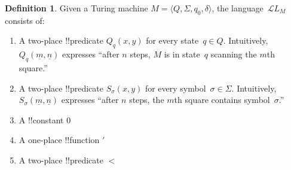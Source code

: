 \documentclass[10pt,a4paper]{article}
\theoremstyle{plain}
\theoremstyle{definition}
\newtheorem{defn}[thm]{Definition}
\theoremstyle{remark}
\newcommand*{\ollabel}[1]{\label{#1}}
\providecommand{\Obj}{}
\providecommand{\Lang}{\ensuremath{\mathcal{L}}}
\providecommand{\tuple}[1]{\langle #1 \rangle}
\providecommand{\num}[1]{\underline{#1}}
\begin{document}
\begin{defn}
  \ollabel{defn:tm-descr}
Given a Turing machine $M = \tuple{Q, \Sigma, q_0, \delta}$, the
language~$\Lang L_M$ consists of:
\begin{enumerate}
\item A two-place !!{predicate} $\Obj Q_q(x, y)$ for every state~$q \in
  Q$.  Intuitively, $\Obj Q_q(\num{m}, \num{n})$ expresses ``after $n$
  steps, $M$ is in state~$q$ scanning the $m$th square.''
\item A two-place !!{predicate} $\Obj S_\sigma(x, y)$ for every
  symbol~$\sigma\in \Sigma$.  Intuitively, $\Obj S_\sigma(\num{m},
  \num{n})$ expresses ``after $n$ steps, the $m$th square contains
  symbol~$\sigma$.''
\item A !!{constant} $\Obj 0$
\item A one-place !!{function} $\prime$
\item A two-place !!{predicate} $<$
\end{enumerate}
\end{defn}
\end{document}
